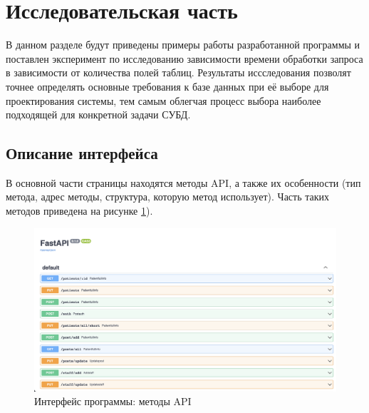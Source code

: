 \section{\large Исследовательская часть}
\label{cha:research}

В данном разделе будут приведены примеры работы разработанной программы и поставлен эксперимент по исследованию зависимости времени обработки запроса в зависимости от количества полей таблиц. Результаты иссследования позволят точнее определять основные требования к базе данных при её выборе для проектирования системы, тем самым облегчая процесс выбора наиболее подходящей для конкретной задачи СУБД.	


\subsection{Описание интерфейса}

В основной части страницы находятся методы API, а также их особенности (тип метода, адрес методы, структура, которую метод использует). Часть таких методов приведена на рисунке \ref{fig:interface-1}). 
\begin{figure}[h]
	\centering
	\captionsetup{justification=centering}
	\includegraphics[width=170mm]{img/interface.png}
	\caption{Интерфейс программы: методы API}
	\label{fig:interface-1}
\end{figure}

